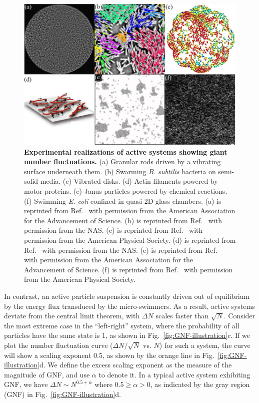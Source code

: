 \begin{figure}[!htbp]
 \begin{center}
 \includegraphics[width=5.5 in]{Figs/1-Intro/GNF-experiments.pdf}
 \end{center}
 \caption[Experimental Realizations of Active Systems Showing Giant Number Fluctuations]
 {
 \textbf{Experimental realizations of active systems showing giant number fluctuations.}
 (a) Granular rods driven by a vibrating surface underneath them.
 (b) Swarming \textit{B. subtilis} bacteria on semi-solid media.
 (c) Vibrated disks.
 (d) Actin filaments powered by motor proteins.
 (e) Janus particles powered by chemical reactions.
 (f) Swimming \textit{E. coli} confined in quasi-2D glass chambers.
 (a) is reprinted from Ref.~\cite{Narayan2007} with permission from the American Association for the Advancement of Science.
 (b) is reprinted from Ref.~\cite{Zhang2010} with permission from the NAS.
 (c) is reprinted from Ref.~\cite{Deseigne2010} with permission from the American Physical Society.
 (d) is reprinted from Ref.~\cite{Schaller2013} with permission from the NAS.
 (e) is reprinted from Ref.~\cite{Palacci2013} with permission from the American Association for the Advancement of Science.
 (f) is reprinted from Ref.~\cite{Nishiguchi2017} with permission from the American Physical Society.
 }
 \label{fig:GNF-experiments}
\end{figure}

In contrast, an active particle suspension is constantly driven out of equilibrium by the energy flux transduced by the micro-swimmers.
As a result, active systems deviate from the central limit theorem, with $\Delta N$ scales faster than $\sqrt N$.
Consider the most extreme case in the ``left-right'' system, where the probability of all particles have the same state is 1, as shown in Fig.~\ref{fig:GNF-illustration}c.
If we plot the number fluctuation curve ($\Delta N/\sqrt N$ vs. $N$) for such a system, the curve will show a scaling exponent 0.5, as shown by the orange line in Fig.~\ref{fig:GNF-illustration}d.
We define the excess scaling exponent as the measure of the magnitude of GNF, and use $\alpha$ to denote it.
In a typical active system exhibiting GNF, we have $\Delta N \sim N^{0.5+\alpha}$ where $0.5\ge\alpha>0$, as indicated by the gray region (GNF) in Fig.~\ref{fig:GNF-illustration}d.

